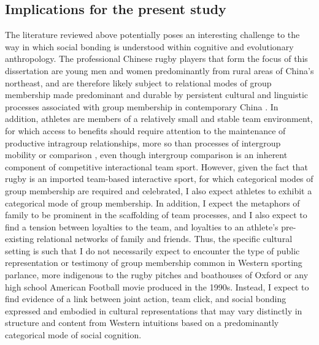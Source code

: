 \subsection{Implications for the present study}
The literature reviewed above potentially poses an interesting challenge to the way in which social bonding is understood within cognitive and evolutionary anthropology.  The professional Chinese rugby players that form the focus of this dissertation are young men and women predominantly from rural areas of China's northeast, and are therefore likely subject to relational modes of group membership made predominant and durable by persistent cultural and linguistic processes associated with group membership in contemporary China \citep{Liu2009}.  In addition, athletes are members of a relatively small and stable team environment, for which access to benefits should require attention to the maintenance of productive intragroup relationships, more so than processes of intergroup mobility or comparison \citep{Schug2010}, even though intergroup comparison is an inherent component of competitive interactional team sport. However, given the fact that rugby is an imported team-based interactive sport, for which categorical modes of group membership are required and celebrated, I also expect athletes to exhibit a categorical mode of group membership.
In addition, I expect the metaphors of family to be prominent in the scaffolding of team processes, and I also expect to find a tension between loyalties to the team, and loyalties to an athlete's pre-existing relational networks of family and friends\citep{Yang1994}.  Thus, the specific cultural setting is such that I do not necessarily expect to encounter the type of public representation or testimony of group membership common in Western sporting parlance, more indigenous to the rugby pitches and boathouses of Oxford or any high school American Football movie produced in the 1990s.  Instead, I expect to find evidence of a link between joint action, team click, and social bonding expressed and embodied in cultural representations that may vary distinctly in structure and content from Western intuitions based on a predominantly categorical mode of social cognition.







